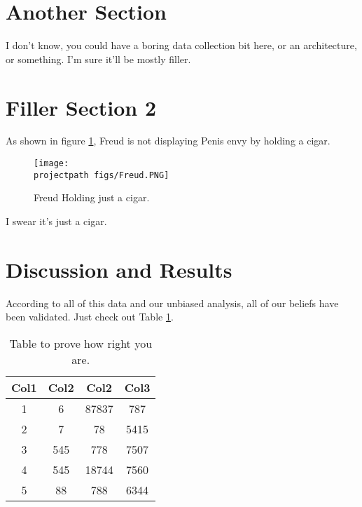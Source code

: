 \section{Another Section}

I don't know, you could have a boring data collection bit here, or an architecture, or something. I'm sure it'll be mostly filler.

\section{Filler Section 2}

As shown in figure \ref{fig:Freud}, Freud is not displaying Penis envy by holding a cigar.

\begin{figure}[h]
    \centering
    \texttt{[image: \\projectpath figs/Freud.PNG]}
    \vspace{0.1in}
    \caption{Freud Holding just a cigar.}
    \label{fig:Freud}
    \vspace{0.1in}
\end{figure}

I swear it's just a cigar.

\section{Discussion and Results}

According to all of this data and our unbiased analysis, all of our beliefs have been validated. Just check out Table \ref{table:1}.

\begin{table}[h!]
\vspace{0.1in}
\begin{center}
\begin{tabular}{||c c c c||} 
 \hline
 Col1 & Col2 & Col2 & Col3 \\ [0.5ex] 
 \hline\hline
 1 & 6 & 87837 & 787 \\ 
 \hline
 2 & 7 & 78 & 5415 \\
 \hline
 3 & 545 & 778 & 7507 \\
 \hline
 4 & 545 & 18744 & 7560 \\
 \hline
 5 & 88 & 788 & 6344 \\ [1ex] 
 \hline
\end{tabular}
\vspace{0.1in}
\caption{Table to prove how right you are.}
\label{table:1}
\end{center}
\end{table}


